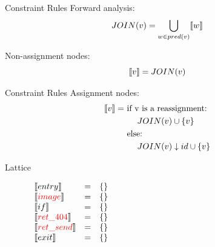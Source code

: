 \begin{frame}{Constraint Rules}{}
  {\color{red} Forward} analysis:
  \[ JOIN(v) = \bigcup_{ w \in pred(v)} \llbracket w \rrbracket \]

  Non-assignment nodes:
    \[ \llbracket v \rrbracket = JOIN(v) \]
\end{frame}


\begin{frame}{Constraint Rules}{}
    Assignment nodes:
  \begin{align*}
  \llbracket v \rrbracket = &\text{ if v is a reassignment:}\\
  &\phantom{==}JOIN(v) \cup \{ v \}\\
  &\text{ else:}\\
  &\phantom{==}JOIN(v) \downarrow id \cup \{ v \}\\
  \end{align*}
\end{frame}

\begin{frame}{Lattice}
  
\end{frame}


\begin{frame}
\[
\begin{array}{lclcl}
  \constraint{entry} & = & \{\} & &\\
  \assignconstraint{image} & = & \{\} &\\
  \constraint{if} & = & \{\}&\\
  \assignconstraint{ret\_404} & = & \{\}&\\
  \assignconstraint{ret\_send} & = & \{\}&\\
  \constraint{exit} & = & \{\}&\\
  && \phantom{\{command, paramssdd\}} && \phantom{\{command, param\}}
\end{array}
\]
\end{frame}

